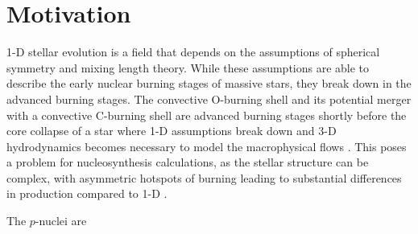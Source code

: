 \section{Motivation}

1-D stellar evolution is a field that depends on the assumptions of spherical symmetry and mixing length theory.
While these assumptions are able to describe the early nuclear burning stages of massive stars, they break down in the advanced burning stages.
The convective O-burning shell and its potential merger with a convective C-burning shell are advanced burning stages shortly before the core collapse of a star where 1-D assumptions break down and 3-D hydrodynamics becomes necessary to model the macrophysical flows \citep{meakinTurbulentConvectionStellar2007, jonesIdealizedHydrodynamicSimulations2017, andrassy3DHydrodynamicSimulations2020}.
This poses a problem for nucleosynthesis calculations, as the stellar structure can be complex, with asymmetric hotspots of burning leading to substantial differences in production compared to 1-D \citep{bazanConvectionNucleosynthesisCore1994, rizzutiShellMergersLate2024a}.

The $p$-nuclei are 